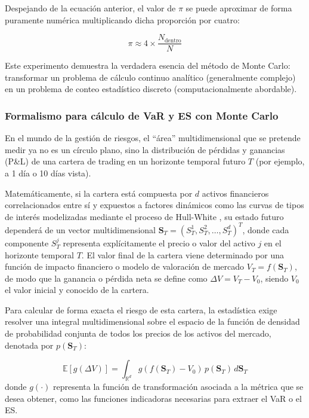 \documentclass[11pt]{article}
\begin{document}
Despejando de la ecuación anterior, el valor de $\pi$ se puede aproximar de forma puramente numérica multiplicando dicha proporción por cuatro:

\begin{equation}
\pi \approx 4 \times \frac{N_{\text{dentro}}}{N}
\end{equation}

Este experimento demuestra la verdadera esencia del método de Monte Carlo: transformar un problema de cálculo continuo analítico (generalmente complejo) en un problema de conteo estadístico discreto (computacionalmente abordable).

\subsubsection{Formalismo para cálculo de VaR y ES con Monte Carlo}

En el mundo de la gestión de riesgos, el ``área'' multidimensional que se pretende medir ya no es un círculo plano, sino la distribución de pérdidas y ganancias (P\&L) de una cartera de trading en un horizonte temporal futuro $T$ (por ejemplo, a 1 día o 10 días vista).

Matemáticamente, si la cartera está compuesta por $d$ activos financieros correlacionados entre sí y expuestos a factores dinámicos como las curvas de tipos de interés modelizadas mediante el proceso de Hull-White \cite{hull1990pricing}, su estado futuro dependerá de un vector multidimensional $\mathbf{S}_T = (S_T^1, S_T^2, \dots, S_T^d)^T$, donde cada componente $S_T^j$ representa explícitamente el precio o valor del activo $j$ en el horizonte temporal $T$. El valor final de la cartera viene determinado por una función de impacto financiero o modelo de valoración de mercado $V_T = f(\mathbf{S}_T)$, de modo que la ganancia o pérdida neta se define como $\Delta V = V_T - V_0$, siendo $V_0$ el valor inicial y conocido de la cartera.

Para calcular de forma exacta el riesgo de esta cartera, la estadística exige resolver una integral multidimensional sobre el espacio de la función de densidad de probabilidad conjunta de todos los precios de los activos del mercado, denotada por $p(\mathbf{S}_T)$:

\begin{equation}
\mathbb{E}[g(\Delta V)] = \int_{\mathbb{R}^d} g(f(\mathbf{S}_T) - V_0) \, p(\mathbf{S}_T) \, d\mathbf{S}_T
\end{equation}
donde $g(\cdot)$ representa la función de transformación asociada a la métrica que se desea obtener, como las funciones indicadoras necesarias para extraer el VaR o el ES.
\end{document}
